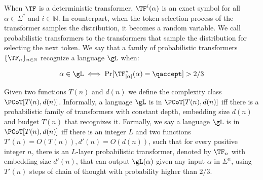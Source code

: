 
When $\TF$ is a deterministic transformer, $\TF^i(\alpha)$ is an exact symbol for all $\alpha \in \Sigma^*$ and $i \in \mathbb{N}$.
In counterpart, when the token selection process of the transformer samples the distribution, it becomes a random variable.
We call probabilistic transformers to the transformers that sample the distribution for selecting the next token.
We say that a family of probabilistic transformers $\{\TF_n\}_{n \in \mathbb{N}}$ recognize a language $\gL$ when: 

\[
\alpha \in \gL \iff \Pr[\TF_{|\alpha|}^*(\alpha) = \qaccept] > 2/3
\]

Given two functions $T(n)$ and $d(n)$ we define the complexity class $\PCoT[T(n), d(n)]$.
Informally, a language $\gL$ is in $\PCoT[T(n), d(n)]$ iff there is a probabilistic family of transformers with constant depth, embedding size $d(n)$ and budget $T(n)$ that recognizes it.
Formally, we say a language  $\gL$ is in $\PCoT[T(n), d(n)]$ iff there is an integer $L$ and two functions $T'(n) = O(T(n)), d'(n) = O(d(n))$, such that for every positive integer $n$, there is an $L$-layer probabilistic transformer, denoted by $\TF_n$ with embedding size $d'(n)$, that can output $\gL(\alpha)$ given any input $\alpha$ in $\Sigma^n$, using $T'(n)$ steps of chain of thought with probability higher than $2/3$.
